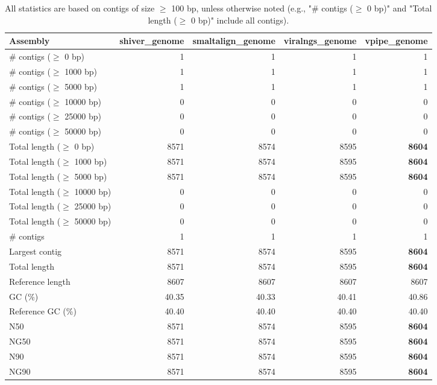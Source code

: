 \documentclass[12pt,a4paper]{article}
\begin{document}
\begin{table}[ht]
\begin{center}
\caption{All statistics are based on contigs of size $\geq$ 100 bp, unless otherwise noted (e.g., "\# contigs ($\geq$ 0 bp)" and "Total length ($\geq$ 0 bp)" include all contigs).}
\begin{tabular}{|l*{4}{|r}|}
\hline
Assembly & shiver\_genome & smaltalign\_genome & viralngs\_genome & vpipe\_genome \\ \hline
\# contigs ($\geq$ 0 bp) & 1 & 1 & 1 & 1 \\ \hline
\# contigs ($\geq$ 1000 bp) & 1 & 1 & 1 & 1 \\ \hline
\# contigs ($\geq$ 5000 bp) & 1 & 1 & 1 & 1 \\ \hline
\# contigs ($\geq$ 10000 bp) & 0 & 0 & 0 & 0 \\ \hline
\# contigs ($\geq$ 25000 bp) & 0 & 0 & 0 & 0 \\ \hline
\# contigs ($\geq$ 50000 bp) & 0 & 0 & 0 & 0 \\ \hline
Total length ($\geq$ 0 bp) & 8571 & 8574 & 8595 & {\bf 8604} \\ \hline
Total length ($\geq$ 1000 bp) & 8571 & 8574 & 8595 & {\bf 8604} \\ \hline
Total length ($\geq$ 5000 bp) & 8571 & 8574 & 8595 & {\bf 8604} \\ \hline
Total length ($\geq$ 10000 bp) & 0 & 0 & 0 & 0 \\ \hline
Total length ($\geq$ 25000 bp) & 0 & 0 & 0 & 0 \\ \hline
Total length ($\geq$ 50000 bp) & 0 & 0 & 0 & 0 \\ \hline
\# contigs & 1 & 1 & 1 & 1 \\ \hline
Largest contig & 8571 & 8574 & 8595 & {\bf 8604} \\ \hline
Total length & 8571 & 8574 & 8595 & {\bf 8604} \\ \hline
Reference length & 8607 & 8607 & 8607 & 8607 \\ \hline
GC (\%) & 40.35 & 40.33 & 40.41 & 40.86 \\ \hline
Reference GC (\%) & 40.40 & 40.40 & 40.40 & 40.40 \\ \hline
N50 & 8571 & 8574 & 8595 & {\bf 8604} \\ \hline
NG50 & 8571 & 8574 & 8595 & {\bf 8604} \\ \hline
N90 & 8571 & 8574 & 8595 & {\bf 8604} \\ \hline
NG90 & 8571 & 8574 & 8595 & {\bf 8604} \\ \hline

\end{tabular}
\end{center}
\end{table}
\end{document}
